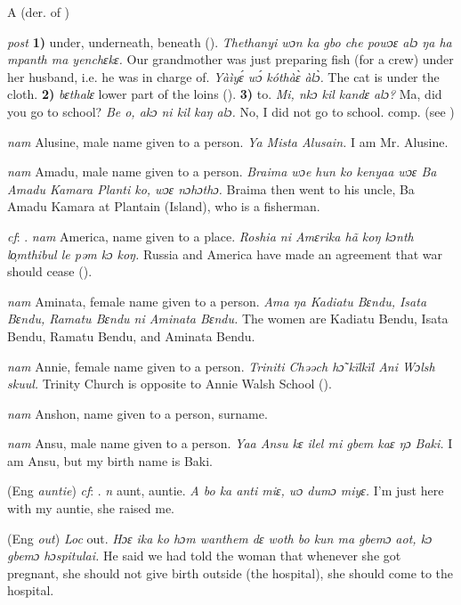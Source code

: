 \begin{letter}{A}
 (der. of ) 

 \textit{post} \textbf{1)} under, underneath, beneath (\citealt{Sumner1921}). \textit{Thethanyi wɔn ka gbo che powɔɛ alɔ ŋa ha mpanth ma yenchɛkɛ.} Our grandmother was just preparing fish (for a crew) under her husband, i.e. he was in charge of. \textit{Yàìyɛ́ wɔ́ kóthàɛ̀ àlɔ̀.} The cat is under the cloth.  \textbf{2)} \textit{bɛthalɛ} lower part of the loins (\citealt{Pichl1967}). \textbf{3)} to. \textit{Mi, nkɔ kil kandɛ alɔ?} Ma, did you go to school? \textit{Be o, akɔ ni kil kaŋ alɔ.} No, I did not go to school. comp.  (see ) 

 \textit{nam} Alusine, male name given to a person. \textit{Ya Mista Alusain.} I am Mr. Alusine.

 \textit{nam} Amadu, male name given to a person. \textit{Braima wɔe hun ko kenyaa wɔɛ Ba Amadu Kamara Planti ko, wɔɛ nɔhɔthɔ.} Braima then went to his uncle, Ba Amadu Kamara at Plantain (Island), who is a fisherman.

 \textit{cf}: . \textit{nam} America, name given to a place. \textit{Roshia ni Amɛrika hã koŋ kɔnth lo̹mthibul le pəm kɔ koŋ.} Russia and America have made an agreement that war should cease (\citealt{Pichl1967}).

 \textit{nam} Aminata, female name given to a person. \textit{Ama ŋa Kadiatu Bɛndu, Isata Bɛndu, Ramatu Bɛndu ni Aminata Bɛndu.} The women are Kadiatu Bendu, Isata Bendu, Ramatu Bendu, and Aminata Bendu.

 \textit{nam} Annie, female name given to a person. \textit{Triniti Chəəch hɔ̃ kïlkïl Ani Wɔlsh skuul.} Trinity Church is opposite to Annie Walsh School (\citealt{Pichl1967}). 

 \textit{nam} Anshon, name given to a person, surname.

 \textit{nam} Ansu, male name given to a person. \textit{Yaa Ansu kɛ ilel mi gbem kaɛ ŋɔ Baki.} I am Ansu, but my birth name is Baki.

 (Eng \textit{auntie}) \textit{cf}: . \textit{n} aunt, auntie. \textit{A bo ka anti miɛ, wɔ dumɔ miyɛ.} I'm just here with my auntie, she raised me.

 (Eng \textit{out}) \textit{Loc} out. \textit{Hɔɛ ika ko hɔm wanthem dɛ woth bo kun ma gbemɔ aot, kɔ gbemɔ hɔspitulai.} He said we had told the woman that whenever she got pregnant, she should not give birth outside (the hospital), she should come to the hospital.


\end{letter}
